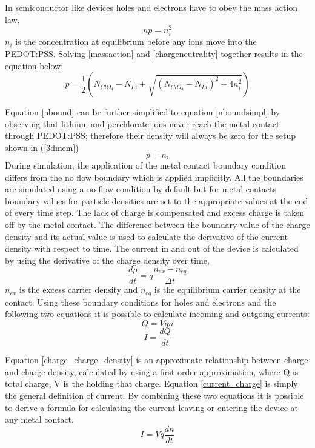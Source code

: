\begin{doublespace}
In semiconductor like devices holes and electrons have to obey the mass action law\cite{Physem},
\begin{equation}
np=n_i^2
\label{massaction}
\end{equation}
 $n_i$ is the concentration at equilibrium before any ions move into the PEDOT:PSS. Solving \eqref{massaction} and \eqref{chargeneutrality} together results in the equation below:
\begin{equation}
p=\frac{1}{2}(N_{ClO_{4}} -  N_{Li} + \sqrt{(N_{ClO_{4}} -  N_{Li})^2+4n_i^2})
\label{nbound}
\end{equation}

Equation \ref{nbound} can be further simplified to equation \ref{nboundsimpl} by observing that lithium and perchlorate ions never reach the metal contact through PEDOT:PSS; therefore their density will always be zero for the setup shown in (\ref{3dmem}) 
\begin{equation}
p=n_i
\label{nboundsimpl}
\end{equation}
During simulation, the application of the metal contact boundary condition differs from the no flow boundary which is applied implicitly. All the boundaries are simulated using a no flow condition by default but for metal contacts boundary values for particle densities are set to the appropriate values at the end of every time step. The lack of charge is compensated and excess charge is taken off by the metal contact. The difference between the boundary value of the charge density and its actual value is used to calculate the derivative of the current density with respect to time. The current in and out of the device is calculated by using the derivative of the charge density over time,
\begin{equation}
\frac{d\rho}{dt}=q\frac{n_{ex}-n_{eq}}{\Delta t}
\end{equation}
 $n_{ex}$ is the excess carrier density and $n_{eq}$ is the equilibrium carrier density at the contact. Using these boundary conditions for holes and electrons and the following two equations it is possible to calculate incoming and outgoing currents\cite{PocketRef}:
\begin{equation}
Q=Vqn
\label{charge_charge_density}
\end{equation} 
\begin{equation}
I=\frac{dQ}{dt}
\label{current_charge}
\end{equation} 
 
Equation \ref{charge_charge_density} is an approximate relationship between charge and charge density, calculated by using a first order approximation, where Q is total charge, V is the  holding that charge. Equation \ref{current_charge} is simply the general definition of current. By combining these two equations it is possible to derive a formula for calculating the current leaving or entering the device at any metal contact,
\begin{equation}
I=V q\frac{dn}{dt}
\label{current_charge_density}
\end{equation}


\end{doublespace}
